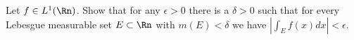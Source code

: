 Let $f\in L^1(\Rn)$. Show that for any $\epsilon>0$ there is a
$\delta>0$ such that for every Lebesgue measurable set $E\subset \Rn$
with $m(E)<\delta$ we have $|\int_Ef(x)dx|<\epsilon$.
